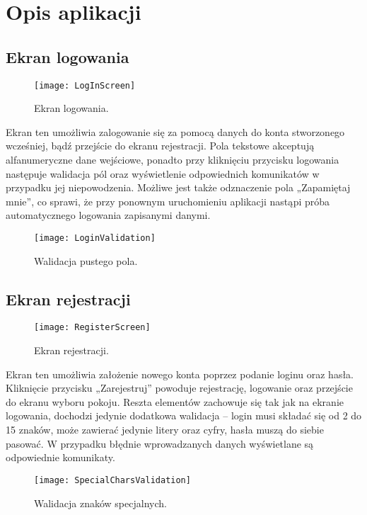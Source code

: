 \chapter{Opis aplikacji}
\section{Ekran logowania}
\begin{figure}[htbp]
\centering
\texttt{[image: LogInScreen]}
\caption{Ekran logowania.}
\label{fig:loginscreen}
\end{figure}

Ekran ten umożliwia zalogowanie się za pomocą danych do konta stworzonego wcześniej, bądź przejście do ekranu rejestracji. Pola tekstowe akceptują alfanumeryczne dane wejściowe, ponadto przy kliknięciu przycisku logowania następuje walidacja pól oraz wyświetlenie odpowiednich komunikatów w przypadku jej niepowodzenia. Możliwe jest także odznaczenie pola „Zapamiętaj mnie”, co sprawi, że przy ponownym uruchomieniu aplikacji nastąpi próba automatycznego logowania zapisanymi danymi. 

\begin{figure}[htbp]
\centering
\texttt{[image: LoginValidation]}
\caption{Walidacja pustego pola.}
\label{fig:loginvalidation}
\end{figure}

\section{Ekran rejestracji}
\begin{figure}[htbp]
\centering
\texttt{[image: RegisterScreen]}
\caption{Ekran rejestracji.}
\label{fig:registerscreen}
\end{figure}

Ekran ten umożliwia założenie nowego konta poprzez podanie loginu oraz hasła. Kliknięcie przycisku „Zarejestruj” powoduje rejestrację, logowanie oraz przejście do ekranu wyboru pokoju. Reszta elementów zachowuje się tak jak na ekranie logowania, dochodzi jedynie dodatkowa walidacja – login musi składać się od 2 do 15 znaków, może zawierać jedynie litery oraz cyfry, hasła muszą do siebie pasować. W przypadku błędnie wprowadzanych danych wyświetlane są odpowiednie komunikaty.

\begin{figure}[htbp]
\centering
\texttt{[image: SpecialCharsValidation]}
\caption{Walidacja znaków specjalnych.}
\label{fig:specialcharsvalidation}
\end{figure}

